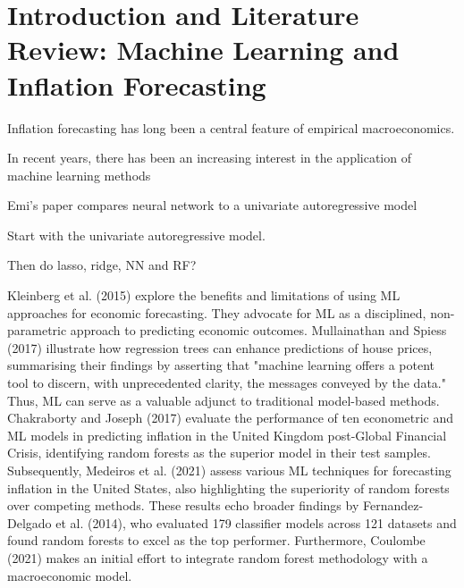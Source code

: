 \pagebreak
\section{Introduction and Literature Review: Machine Learning and Inflation Forecasting} \label{sec:lit}


Inflation forecasting has long been a central feature of empirical macroeconomics. 

In recent years, there has been an increasing interest in the application of machine learning methods 

Emi's paper compares neural network to a univariate autoregressive model

Start with the univariate autoregressive model.

Then do lasso, ridge, NN and RF?

Kleinberg et al. (2015) explore the benefits and limitations of using ML approaches for economic forecasting. They advocate for ML as a disciplined, non-parametric approach to predicting economic outcomes. Mullainathan and Spiess (2017) illustrate how regression trees can enhance predictions of house prices, summarising their findings by asserting that "machine learning offers a potent tool to discern, with unprecedented clarity, the messages conveyed by the data." Thus, ML can serve as a valuable adjunct to traditional model-based methods. Chakraborty and Joseph (2017) evaluate the performance of ten econometric and ML models in predicting inflation in the United Kingdom post-Global Financial Crisis, identifying random forests as the superior model in their test samples. Subsequently, Medeiros et al. (2021) assess various ML techniques for forecasting inflation in the United States, also highlighting the superiority of random forests over competing methods. These results echo broader findings by Fernandez-Delgado et al. (2014), who evaluated 179 classifier models across 121 datasets and found random forests to excel as the top performer. Furthermore, Coulombe (2021) makes an initial effort to integrate random forest methodology with a macroeconomic model.